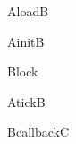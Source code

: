 \documentclass{article}
\begin{document}
	\begin{figure}
		\centering
		\scalebox{1}
		{  \begin{sequencediagram}
				\begin{call}{A}{load}{B}{}
				\end{call}
				\begin{call}{A}{init}{B}{}
				\end{call}
			\begin{sdblock}{Block}{}
				\begin{call}{A}{tick}{B}{}
					\begin{call}{B}{callback}{C}{}
					\end{call}
				\end{call}
			\end{sdblock}
			
			\end{sequencediagram}
		}
	\end{figure}
\end{document}
